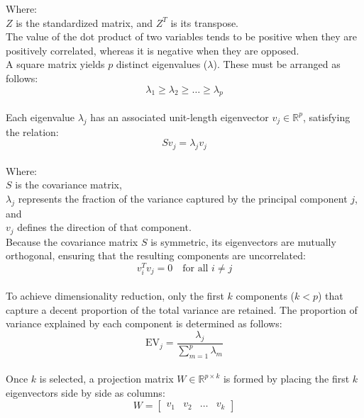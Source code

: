 \documentclass[eng]{ajceam-class}
\begin{document}
Where:\\
$Z$ is the standardized matrix, and $Z^T$ is its transpose.\\

The value of the dot product of two variables tends to be positive when they are positively correlated, whereas it is negative when they are opposed.\\

A square matrix yields $p$ distinct eigenvalues ($\lambda$). These must be arranged as follows:\\

{\large \[ \lambda_1 \geq \lambda_2 \geq \dots \geq \lambda_p \]}\\

Each eigenvalue $\lambda_j$ has an associated unit-length eigenvector $v_j \in \mathbb{R}^{p}$, satisfying the relation:\\

{\large$$Sv_j = \lambda_j v_j$$}\\

Where:\\
$S$ is the covariance matrix,\\
$\lambda_j$ represents the fraction of the variance captured by the principal component $j$, and\\
$v_j$ defines the direction of that component.\\

Because the covariance matrix $S$ is symmetric, its eigenvectors are mutually orthogonal, ensuring that the resulting components are uncorrelated:\\

{\large$$v_i^T v_j = 0 \quad \text{for all } i \neq j$$}\\

To achieve dimensionality reduction, only the first $k$ components ($k < p$) that capture a decent proportion of the total variance are retained. The proportion of variance explained by each component is determined as follows:\\

{\large$$\text{EV}_j = \frac{\lambda_j}{\sum_{m=1}^{p} \lambda_m}$$}\\

Once $k$ is selected, a projection matrix $W \in \mathbb{R}^{p \times k}$ is formed by placing the first $k$ eigenvectors side by side as columns:\\

{\large$$W = \begin{bmatrix} v_1 & v_2 & \dots & v_k \end{bmatrix}$$}\\
\end{document}
